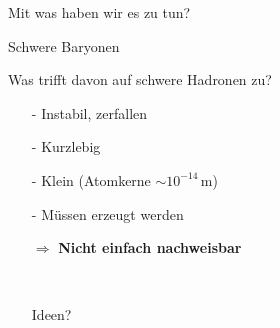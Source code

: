 \begin{frame}{Mit was haben wir es zu tun?}
\begin{minipage}[t]{0.39\textwidth}
\begin{tikzpicture}[yscale = 1.2,xscale=0.6]
    \end{tikzpicture}
Schwere Baryonen
           \end{minipage}
            \begin{minipage}[t]{0.59\textwidth}
Was trifft davon auf schwere Hadronen zu? \pause %
\begin{center}
        \begin{itemize}
            \item[-] Instabil, zerfallen
            \item[-] Kurzlebig
                        \item[-] Klein {\small(Atomkerne $\sim 10^{-14}\,$m})
            \item[-] Müssen erzeugt werden
            \item [$\Rightarrow$] \textbf{Nicht einfach nachweisbar}
            \\\item [\,] \pause
            \item [\ding{43}] Ideen?
        \end{itemize}
        \end{center}
      \end{minipage}
    \end{frame}
    \subsection{}

